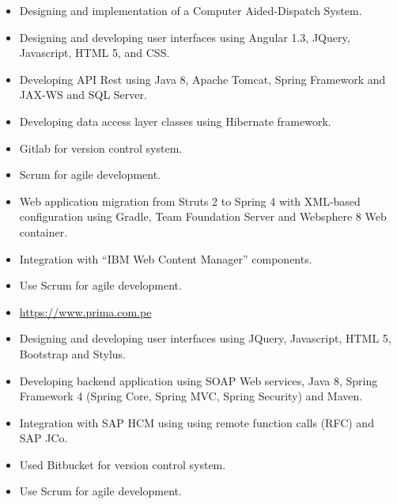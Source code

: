 \documentclass[10pt,a4paper,ragged2e]{altacv}
\begin{document}
\vspace{5px}
\divider
\vspace{5px}

\begin{itemize}
   \item Designing and implementation of a Computer Aided-Dispatch System.
   \item Designing and developing user interfaces using  Angular 1.3, JQuery, Javascript, HTML 5, and CSS.
   \item Developing API Rest using Java 8, Apache Tomcat, Spring Framework and JAX-WS and SQL Server.
   \item Developing data access layer classes using Hibernate framework.
   \item Gitlab for version control system.
   \item Scrum for agile development.
\end{itemize}

\vspace{5px}
\divider
\vspace{5px}

\begin{itemize}
   \item Web application migration from Struts 2 to Spring 4 with XML-based configuration using Gradle, Team Foundation Server and Websphere 8 Web container.
   \item Integration with “IBM Web Content Manager” components.
   \item Use Scrum for agile development.
   \item \url{https://www.prima.com.pe}
\end{itemize}

\vspace{5px}
\divider
\vspace{5px}

\begin{itemize}
   \item Designing and developing user interfaces using JQuery, Javascript, HTML 5, Bootstrap and Stylus.
   \item Developing backend application using SOAP Web services, Java 8, Spring Framework 4 (Spring Core, Spring MVC, Spring Security) and Maven.
   \item Integration with SAP HCM using using remote function calls (RFC) and SAP JCo.
   \item Used Bitbucket for version control system.
   \item Use Scrum for agile development.
\end{itemize}
\end{document}
